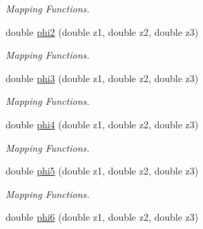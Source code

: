 \begin{DoxyCompactItemize}
\begin{DoxyCompactList}\small\item\em Mapping Functions. \item\end{DoxyCompactList}\item 
\hypertarget{classfemfunctions_a87a53130af834e2bcd5666448fce3873}{
double \hyperlink{classfemfunctions_a87a53130af834e2bcd5666448fce3873}{phi2} (double z1, double z2, double z3)}
\label{classfemfunctions_a87a53130af834e2bcd5666448fce3873}

\begin{DoxyCompactList}\small\item\em Mapping Functions. \item\end{DoxyCompactList}\item 
\hypertarget{classfemfunctions_a306b55566f8f14049f49b63069f02e78}{
double \hyperlink{classfemfunctions_a306b55566f8f14049f49b63069f02e78}{phi3} (double z1, double z2, double z3)}
\label{classfemfunctions_a306b55566f8f14049f49b63069f02e78}

\begin{DoxyCompactList}\small\item\em Mapping Functions. \item\end{DoxyCompactList}\item 
\hypertarget{classfemfunctions_ab8d2dd947305bf0e2e12ecd48423b95a}{
double \hyperlink{classfemfunctions_ab8d2dd947305bf0e2e12ecd48423b95a}{phi4} (double z1, double z2, double z3)}
\label{classfemfunctions_ab8d2dd947305bf0e2e12ecd48423b95a}

\begin{DoxyCompactList}\small\item\em Mapping Functions. \item\end{DoxyCompactList}\item 
\hypertarget{classfemfunctions_ab115e27c90a94cbe63a2702f7f17ce5f}{
double \hyperlink{classfemfunctions_ab115e27c90a94cbe63a2702f7f17ce5f}{phi5} (double z1, double z2, double z3)}
\label{classfemfunctions_ab115e27c90a94cbe63a2702f7f17ce5f}

\begin{DoxyCompactList}\small\item\em Mapping Functions. \item\end{DoxyCompactList}\item 
\hypertarget{classfemfunctions_a0428bfcf13c282bbdb8bdbd24ea4bb01}{
double \hyperlink{classfemfunctions_a0428bfcf13c282bbdb8bdbd24ea4bb01}{phi6} (double z1, double z2, double z3)}
\label{classfemfunctions_a0428bfcf13c282bbdb8bdbd24ea4bb01}


\end{DoxyCompactItemize}
